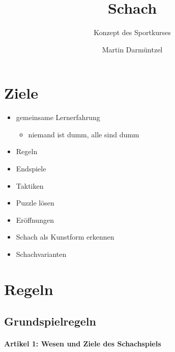 \documentclass[
  a4paper,
  justified,
  nobib,
]{tufte-handout}
\title{Schach}
\subtitle{Konzept des Sportkurses}
\author{Martin Darmüntzel}
\begin{document}
\maketitle

\section{Ziele}%
\label{sec:ziele}

\begin{itemize}
  \item gemeinsame Lernerfahrung
  \begin{itemize}
    \item niemand ist dumm, alle sind dumm
  \end{itemize}
  \item Regeln
  \item Endspiele
  \item Taktiken
  \item Puzzle lösen
  \item Eröffnungen
  \item Schach als Kunstform erkennen
  \item Schachvarianten
\end{itemize}

\pagebreak

\section{Regeln}%
\label{sec:regeln}

\subsection{Grundspielregeln}%
\label{sub:grundspielregeln}

\paragraph{Artikel 1: Wesen und Ziele des Schachspiels}
\end{document}
